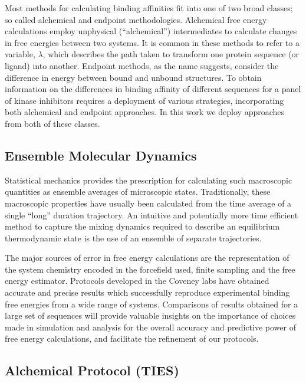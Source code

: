 \documentclass[conference]{IEEEtran}
\begin{document}
Most methods for calculating binding affinities fit into one of two broad classes; so called alchemical and endpoint methodologies. 
Alchemical free energy calculations employ unphysical (“alchemical”) intermediates to calculate changes in free energies between two systems. 
It is common in these methods to refer to a variable, $\lambda$, which describes the path taken to transform one protein sequence (or ligand) into another. 
Endpoint methods, as the name suggests, consider the difference in energy between bound and unbound structures. 
To obtain information on the differences in binding affinity of different sequences for a panel of kinase inhibitors requires a deployment of various strategies, incorporating both alchemical and endpoint approaches. 
In this work we deploy approaches from both of these classes.

\subsection{Ensemble Molecular Dynamics}\label{sec:emd}

Statistical mechanics provides the prescription for calculating such macroscopic quantities as ensemble averages of microscopic states. Traditionally, these macroscopic properties have usually been calculated from the time average of a single “long” duration trajectory. An intuitive and potentially more time efficient method to capture the mixing dynamics required to describe an equilibrium thermodynamic state is the use of an ensemble of separate trajectories. \cite{Coveney2016}

The major sources of error in free energy calculations are the representation of the system chemistry encoded in the forcefield used, finite sampling and the free energy estimator. Protocols developed in the Coveney labs have obtained accurate and precise results which successfully reproduce experimental binding free energies from a wide range of systems. \cite{Wright2014, Wan2017brd4, Wan2015, Wan2011} 
Comparisons of results obtained for a large set of sequences will provide valuable insights on the importance of choices made in simulation and analysis for the overall accuracy and predictive power of free energy calculations, and facilitate the refinement of our protocols.


\subsection{Alchemical Protocol (TIES)}\label{sec:ties}
\end{document}
